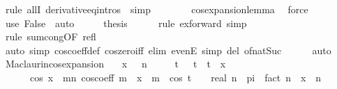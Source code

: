 \begin{isabellebody}
\ {\isacharparenleft}{\kern0pt}rule\ allI\ derivative{\isacharunderscore}{\kern0pt}eq{\isacharunderscore}{\kern0pt}intros\ {\isacharbar}{\kern0pt}\ simp{\isacharparenright}{\kern0pt}{\isacharplus}{\kern0pt}\isanewline
\ \ \ \ \ \ \isamarkupfalse%
\ cos{\isacharunderscore}{\kern0pt}expansion{\isacharunderscore}{\kern0pt}lemma\ \isamarkupfalse%
\ force\isanewline
\ \ \isamarkupfalse%
\ {\isacharparenleft}{\kern0pt}use\ False\ \ auto{\isacharparenright}{\kern0pt}\isanewline
\ \ \isamarkupfalse%
\ \isamarkupfalse%
\ {\isacharquery}{\kern0pt}thesis\isanewline
\ \ \ \ \isamarkupfalse%
\ {\isacharparenleft}{\kern0pt}rule\ ex{\isacharunderscore}{\kern0pt}forward{\isacharcomma}{\kern0pt}\ simp{\isacharparenright}{\kern0pt}\isanewline
\ \ \ \ \isamarkupfalse%
\ {\isacharparenleft}{\kern0pt}rule\ sum{\isachardot}{\kern0pt}cong{\isacharbrackleft}{\kern0pt}OF\ refl{\isacharbrackright}{\kern0pt}{\isacharparenright}{\kern0pt}\isanewline
\ \ \ \ \isamarkupfalse%
\ {\isacharparenleft}{\kern0pt}auto\ simp{\isacharcolon}{\kern0pt}\ cos{\isacharunderscore}{\kern0pt}coeff{\isacharunderscore}{\kern0pt}def\ cos{\isacharunderscore}{\kern0pt}zero{\isacharunderscore}{\kern0pt}iff\ elim{\isacharcolon}{\kern0pt}\ evenE\ simp\ del{\isacharcolon}{\kern0pt}\ of{\isacharunderscore}{\kern0pt}nat{\isacharunderscore}{\kern0pt}Suc{\isacharparenright}{\kern0pt}\isanewline
\ \ \ \ \isamarkupfalse%
\isanewline
{}\isamarkupfalse%
\ auto%
\endisatagproof
{\isafoldproof}%
%
\isadelimproof
\isanewline
%
\endisadelimproof
\isanewline
{}\isamarkupfalse%
\ Maclaurin{\isacharunderscore}{\kern0pt}cos{\isacharunderscore}{\kern0pt}expansion{}{\isacharcolon}{\kern0pt}\isanewline
\ \ \ {\isachardoublequoteopen}x\ {\isachargreater}{\kern0pt}\ {}{\isachardoublequoteclose}\ {\isachardoublequoteopen}n\ {\isachargreater}{\kern0pt}\ {}{\isachardoublequoteclose}\isanewline
\ \ \ {\isachardoublequoteopen}{\isasymexists}t{\isachardot}{\kern0pt}\ {}\ {\isacharless}{\kern0pt}\ t\ {\isasymand}\ t\ {\isacharless}{\kern0pt}\ x\ {\isasymand}\isanewline
\ \ \ \ \ \ cos\ x\ {\isacharequal}{\kern0pt}\ {\isacharparenleft}{\kern0pt}{\isasymSum}m{\isacharless}{\kern0pt}n{\isachardot}{\kern0pt}\ cos{\isacharunderscore}{\kern0pt}coeff\ m\ {\isacharasterisk}{\kern0pt}\ x\ {\isacharcircum}{\kern0pt}\ m{\isacharparenright}{\kern0pt}\ {\isacharplus}{\kern0pt}\ {\isacharparenleft}{\kern0pt}cos\ {\isacharparenleft}{\kern0pt}t\ {\isacharplus}{\kern0pt}\ {}{\isacharslash}{\kern0pt}{}\ {\isacharasterisk}{\kern0pt}\ real\ n\ {\isacharasterisk}{\kern0pt}\ pi{\isacharparenright}{\kern0pt}\ {\isacharslash}{\kern0pt}\ fact\ n{\isacharparenright}{\kern0pt}\ {\isacharasterisk}{\kern0pt}\ x\ {\isacharcircum}{\kern0pt}\ n{\isachardoublequoteclose}\isanewline

\end{isabellebody}
